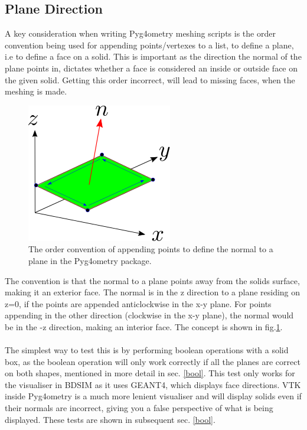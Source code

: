 \documentclass[12pt,a4paper]{article}
\begin{document}
\subsection{Plane Direction}
\label{order}
A key consideration when writing Pyg4ometry meshing scripts is the order convention being used for appending points/vertexes to a list, to define a plane, i.e to define a face on a solid. This is important as the direction the normal of the plane points in, dictates whether a face is considered an inside or outside face on the given solid. Getting this order incorrect, will lead to missing faces, when the meshing is made.
\begin{figure}[h!]
\centering
\includegraphics[scale=0.7]{Images//append_points//Point_Appending_Order.png}
\caption[width=\columnwidth]{The order convention of appending points to define the normal to a plane in the Pyg4ometry package.}
\label{pointsorder}
\end{figure}
\noindent The convention is that the normal to a plane points away from the solids surface, making it an exterior face. The normal is in the z direction to a plane residing on z=0, if the points are appended anticlockwise in the x-y plane. For points appending in the other direction (clockwise in the x-y plane), the normal would be in the -z direction, making an interior face. The concept is shown in fig.\ref{pointsorder}.
\\\\
The simplest way to test this is by performing boolean operations with a solid box, as the boolean operation will only work correctly if all the planes are correct on both shapes, mentioned in more detail in sec. \ref{bool}. This test only works for the visualiser in BDSIM as it uses GEANT4, which displays face directions. VTK inside Pyg4ometry is a much more lenient visualiser and will display solids even if their normals are incorrect, giving you a false perspective of what is being displayed. These tests are shown in subsequent sec. \ref{bool}.
\end{document}

